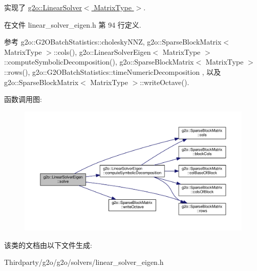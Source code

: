 实现了 \hyperlink{classg2o_1_1LinearSolver_aa44b40826d50203c8ce2ff258c34e030}{g2o\-::\-Linear\-Solver$<$ Matrix\-Type $>$}.



在文件 linear\-\_\-solver\-\_\-eigen.\-h 第 94 行定义.



参考 g2o\-::\-G2\-O\-Batch\-Statistics\-::cholesky\-N\-N\-Z, g2o\-::\-Sparse\-Block\-Matrix$<$ Matrix\-Type $>$\-::cols(), g2o\-::\-Linear\-Solver\-Eigen$<$ Matrix\-Type $>$\-::compute\-Symbolic\-Decomposition(), g2o\-::\-Sparse\-Block\-Matrix$<$ Matrix\-Type $>$\-::rows(), g2o\-::\-G2\-O\-Batch\-Statistics\-::time\-Numeric\-Decomposition , 以及 g2o\-::\-Sparse\-Block\-Matrix$<$ Matrix\-Type $>$\-::write\-Octave().



函数调用图\-:
\nopagebreak
\begin{figure}[H]
\begin{center}
\leavevmode
\includegraphics[width=350pt]{classg2o_1_1LinearSolverEigen_ae4ac566af324a238a31145c1e50b52e1_cgraph}
\end{center}
\end{figure}




该类的文档由以下文件生成\-:\begin{DoxyCompactItemize}
\item 
Thirdparty/g2o/g2o/solvers/linear\-\_\-solver\-\_\-eigen.\-h\end{DoxyCompactItemize}
